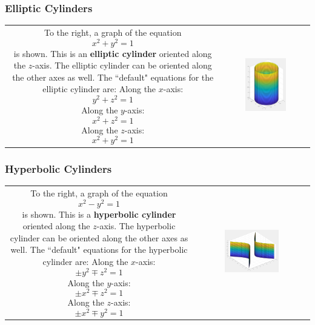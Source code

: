 \documentclass{article}
\begin{document}
\subsubsection*{Elliptic Cylinders} 

\begin{tabular}{cc}
\parbox{0.5\textwidth}{
To the right, a graph of the equation 
\[x^2 + y^2 = 1\]
is shown. This is an {\bf elliptic cylinder} oriented along the \(z\)-axis. The elliptic cylinder can be oriented along the other axes as well. The ``default" equations for the elliptic cylinder are: \\ 
Along the \(x\)-axis:
\[y^2 + z^2 = 1\]
Along the \(y\)-axis:
\[x^2 + z^2 = 1\]
Along the \(z\)-axis:
\[x^2 + y^2 = 1\]
} & \parbox{0.5\textwidth}{
\includegraphics[width = 0.5\textwidth]{elliptic_cylinder.png}
}
\end{tabular}




\subsubsection*{Hyperbolic Cylinders} 

\begin{tabular}{cc}
\parbox{0.5\textwidth}{
To the right, a graph of the equation 
\[x^2 - y^2 = 1\]
is shown. This is a {\bf hyperbolic cylinder} oriented along the \(z\)-axis. The hyperbolic cylinder can be oriented along the other axes as well. The ``default" equations for the hyperbolic cylinder are: \\ 
Along the \(x\)-axis:
\[\pm y^2 \mp z^2 = 1\]
Along the \(y\)-axis:
\[\pm x^2 \mp z^2 = 1\]
Along the \(z\)-axis:
\[\pm x^2 \mp y^2 = 1\]
} & \parbox{0.5\textwidth}{
\includegraphics[width = 0.5\textwidth]{hyperbolic_cylinder.png}
}
\end{tabular}
\end{document}
